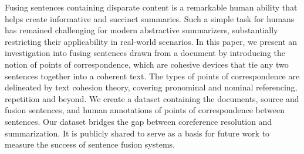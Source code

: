 Fusing sentences containing disparate content is a remarkable human ability that helps create informative and succinct summaries. Such a simple task for humans has remained challenging for modern abstractive summarizers, substantially restricting their applicability in real-world scenarios. In this paper, we present an investigation into fusing sentences drawn from a document by introducing the notion of points of correspondence, which are cohesive devices that tie any two sentences together into a coherent text. The types of points of correspondence are delineated by text cohesion theory, covering pronominal and nominal referencing, repetition and beyond. We create a dataset containing the documents, source and fusion sentences, and human annotations of points of correspondence between sentences. Our dataset bridges the gap between coreference resolution and summarization. It is publicly shared to serve as a basis for future work to measure the success of sentence fusion systems.
